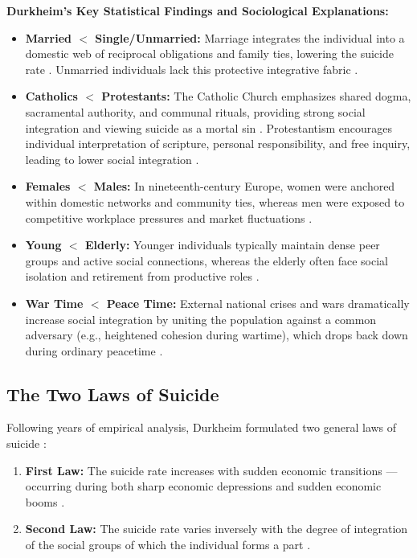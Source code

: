 \begin{DataFact}
\textbf{Durkheim's Key Statistical Findings and Sociological Explanations:}
\begin{itemize}
    \item \textbf{Married $<$ Single/Unmarried:} Marriage integrates the individual into a domestic web of reciprocal obligations and family ties, lowering the suicide rate . Unmarried individuals lack this protective integrative fabric .
    \item \textbf{Catholics $<$ Protestants:} The Catholic Church emphasizes shared dogma, sacramental authority, and communal rituals, providing strong social integration and viewing suicide as a mortal sin . Protestantism encourages individual interpretation of scripture, personal responsibility, and free inquiry, leading to lower social integration .
    \item \textbf{Females $<$ Males:} In nineteenth-century Europe, women were anchored within domestic networks and community ties, whereas men were exposed to competitive workplace pressures and market fluctuations .
    \item \textbf{Young $<$ Elderly:} Younger individuals typically maintain dense peer groups and active social connections, whereas the elderly often face social isolation and retirement from productive roles .
    \item \textbf{War Time $<$ Peace Time:} External national crises and wars dramatically increase social integration by uniting the population against a common adversary (e.g., heightened cohesion during wartime), which drops back down during ordinary peacetime .
\end{itemize}
\end{DataFact}

\subsection{The Two Laws of Suicide}

\begin{KeyConcept}
Following years of empirical analysis, Durkheim formulated two general laws of suicide :
\begin{enumerate}
    \item \textbf{First Law:} The suicide rate increases with sudden economic transitions --- occurring during both sharp economic depressions and sudden economic booms .
    \item \textbf{Second Law:} The suicide rate varies inversely with the degree of integration of the social groups of which the individual forms a part .
\end{enumerate}
\end{KeyConcept}

